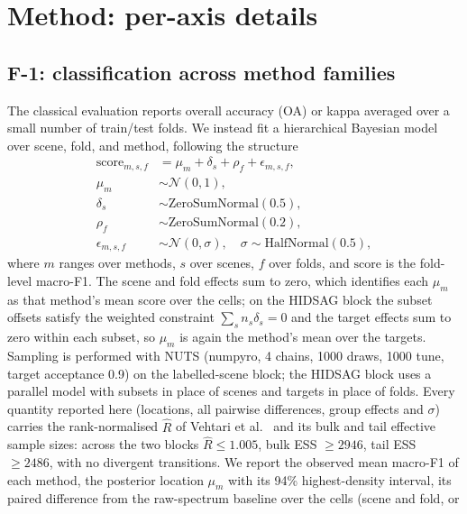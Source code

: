 \documentclass[journal,a4paper,10pt]{IEEEtran}
\begin{document}
\section{Method: per-axis details}
\label{sec:method}

\subsection{F-1: classification across method families}
\label{subsec:b1}

The classical evaluation reports overall accuracy (OA) or kappa
averaged over a small number of train/test folds. We instead fit a
hierarchical Bayesian model over scene, fold, and method, following
the structure
\begin{align}
\text{score}_{m,s,f}
&= \mu_m + \delta_s + \rho_f + \epsilon_{m,s,f}, \\
\mu_m &\sim \mathcal{N}(0, 1), \\
\delta_s &\sim \mathrm{ZeroSumNormal}(0.5), \\
\rho_f &\sim \mathrm{ZeroSumNormal}(0.2), \\
\epsilon_{m,s,f} &\sim \mathcal{N}(0, \sigma), \quad
\sigma \sim \mathrm{HalfNormal}(0.5),
\end{align}
where $m$ ranges over methods, $s$ over scenes, $f$ over folds, and
$\text{score}$ is the fold-level macro-F1. The scene and fold effects
sum to zero, which identifies each $\mu_m$ as that method's mean score
over the cells; on the HIDSAG block the subset offsets satisfy the
weighted constraint $\sum_s n_s \delta_s = 0$ and the target effects
sum to zero within each subset, so $\mu_m$ is again the method's mean
over the targets. Sampling is performed with NUTS (numpyro, 4 chains,
1000 draws, 1000 tune, target acceptance 0.9) on the labelled-scene
block; the HIDSAG block uses a parallel model with subsets in place of
scenes and targets in place of folds. Every quantity reported here
(locations, all pairwise differences, group effects and $\sigma$)
carries the rank-normalised $\widehat{R}$ of Vehtari et
al.~\cite{vehtari2021rhat} and its bulk and tail effective sample
sizes: across the two blocks $\widehat{R} \le 1.005$, bulk ESS $\ge
2946$, tail ESS $\ge 2486$, with no divergent transitions. We report
the observed mean macro-F1 of each method, the posterior location
$\mu_m$ with its 94\% highest-density interval, its paired difference
from the raw-spectrum baseline over the cells (scene and fold, or
\end{document}
